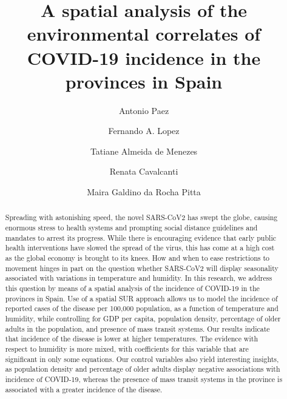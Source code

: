 \documentclass[]{elsarticle} %
\begin{document}
\begin{frontmatter}

  \title{A spatial analysis of the environmental correlates of COVID-19 incidence
in the provinces in Spain}
    \author[McMaster University]{Antonio Paez}
    \author[Universidad Politecnica de Cartagena]{Fernando A. Lopez}
    \author[Universidade Federal de Pernambuco]{Tatiane Almeida de Menezes}
    \author[Universidade Federal de Pernambuco]{Renata Cavalcanti}
    \author[Universidade Federal de Pernambuco]{Maira Galdino da Rocha Pitta}
      \address[McMaster University]{School of Geography and Earth Sciences, 1281 Main St W, Hamilton, ON,
L8S 4K1, Canada}
    \address[Universidad Politecnica de Cartagena]{Departamento de Metodos Cuantitativos, Ciencias Juridicas, y Lenguas
Modernas, Calle Real Numero 3, 30201, Cartagena, Murcia, Spain}
    \address[Universidade Federal de Pernambuco]{Departamento de Economia da Universidade Federal de Pernambuco - UFPE}
  
  \begin{abstract}
  Spreading with astonishing speed, the novel SARS-CoV2 has swept the
  globe, causing enormous stress to health systems and prompting social
  distance guidelines and mandates to arrest its progress. While there is
  encouraging evidence that early public health interventions have slowed
  the spread of the virus, this has come at a high cost as the global
  economy is brought to its knees. How and when to ease restrictions to
  movement hinges in part on the question whether SARS-CoV2 will display
  seasonality associated with variations in temperature and humidity. In
  this research, we address this question by means of a spatial analysis
  of the incidence of COVID-19 in the provinces in Spain. Use of a spatial
  SUR approach allows us to model the incidence of reported cases of the
  disease per 100,000 population, as a function of temperature and
  humidity, while controlling for GDP per capita, population density,
  percentage of older adults in the population, and presence of mass
  transit systems. Our results indicate that incidence of the disease is
  lower at higher temperatures. The evidence with respect to humidity is
  more mixed, with coefficients for this variable that are significant in
  only some equations. Our control variables also yield interesting
  insights, as population density and percentage of older adults display
  negative associations with incidence of COVID-19, whereas the presence
  of mass transit systems in the province is associated with a greater
  incidence of the disease.
  \end{abstract}
  
 \end{frontmatter}
\end{document}
